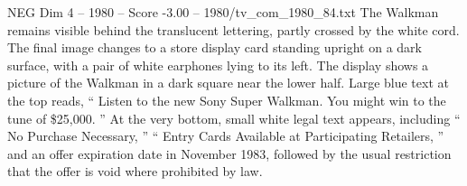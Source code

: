 \begin{textsample}{NEG Dim 4 – 1980 – Score -3.00 – 1980/tv\_com\_1980\_84.txt}
The Walkman remains visible behind the translucent lettering, partly crossed by the white cord.
The final image changes to a store display card standing upright on a dark surface, with a pair of white earphones lying to its left.
The display shows a picture of the Walkman in a dark square near the lower half.
Large blue text at the top reads, “ Listen to the new Sony Super Walkman.
You might win to the tune of \$25,000. ” At the very bottom, small white legal text appears, including “ No Purchase Necessary, ” “ Entry Cards Available at Participating Retailers, ” and an offer expiration date in November 1983, followed by the usual restriction that the offer is void where prohibited by law.

\end{textsample}
